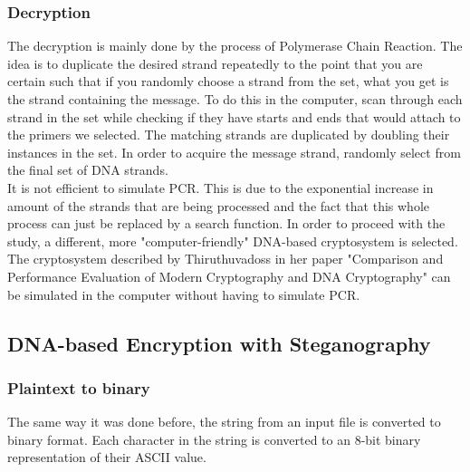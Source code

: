 \subsubsection{Decryption}
The decryption is mainly done by the process of Polymerase Chain Reaction. The idea is to duplicate the desired strand repeatedly to the point that you are certain such that if you randomly choose a strand from the set, what you get is the strand containing the message. To do this in the computer, scan through each strand in the set while checking if they have starts and ends that would attach to the primers we selected. The matching strands are duplicated by doubling their instances in the set. In order to acquire the message strand, randomly select from the final set of DNA strands.\\

It is not efficient to simulate PCR. This is due to the exponential increase in amount of the strands that are being processed and the fact that this whole process can just be replaced by a search function. In order to proceed with the study, a different, more "computer-friendly" DNA-based cryptosystem is selected. The cryptosystem described by Thiruthuvadoss in her paper "Comparison and Performance Evaluation of Modern Cryptography and DNA Cryptography" can be simulated in the computer without having to simulate PCR.

\subsection{DNA-based Encryption with Steganography}
\subsubsection{Plaintext to binary}
The same way it was done before, the string from an input file is converted to binary format. Each character in the string is converted to an 8-bit binary representation of their ASCII value.
